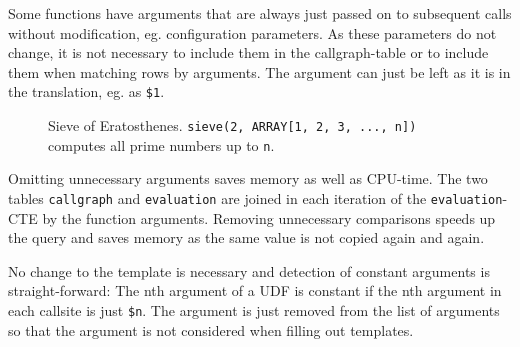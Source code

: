 Some functions have arguments that are always just passed on to subsequent calls without modification, eg. configuration parameters. As these parameters do not change, it is not necessary to include them in the callgraph-table or to include them when matching rows by arguments. The argument can just be left as it is in the translation, eg. as \texttt{\$1}.

\begin{wrapfigure}{r}{0.66\textwidth}
  \vspace{-10pt}
  \caption{Sieve of Eratosthenes. \texttt{sieve(2, ARRAY[1, 2, 3, ..., n])} computes all prime numbers up to \texttt{n}.}
  \label{lst:sieve_udf}
\end{wrapfigure}

Omitting unnecessary arguments saves memory as well as CPU-time. The two tables \texttt{callgraph} and \texttt{evaluation} are joined in each iteration of the \texttt{evaluation}-CTE by the function arguments. Removing unnecessary comparisons speeds up the query and saves memory as the same value is not copied again and again.

No change to the template is necessary and detection of constant arguments is straight-forward: The nth argument of a UDF is constant if the nth argument in each callsite is just \texttt{\$n}. The argument is just removed from the list of arguments so that the argument is not considered when filling out templates.

